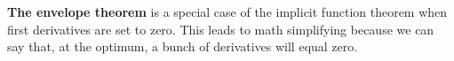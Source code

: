 \documentclass{article}
\begin{document}
\textbf{The envelope theorem} is a special case of the implicit function theorem when first derivatives are set to zero. This leads to math simplifying because we can say that, at the optimum, a bunch of derivatives will equal zero. 










\end{document}
